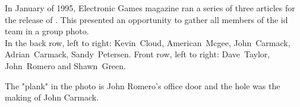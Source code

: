 \par
{}
\par





\begin{figure}
\end{figure}

In January of 1995, Electronic Games magazine ran a series of three articles for the release of \doomii{}. This presented an opportunity to gather all members of the id team in a group photo.\\
 In the back row, left to right: Kevin~Cloud, American~Mcgee, John~Carmack, Adrian~Carmack, Sandy~Petersen. Front row, left to right: Dave~Taylor, John~Romero and Shawn~Green.\\
 \par The "plank" in the photo is John Romero's office door and the hole was the making of John Carmack.\\
  \par
{}






